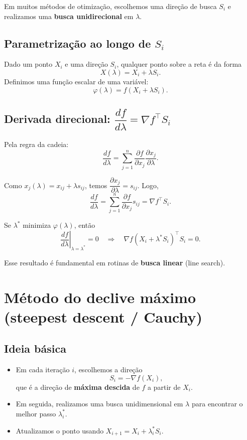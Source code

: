 \documentclass[9pt,a4paper]{extarticle}
\begin{document}
Em muitos métodos de otimização, escolhemos uma direção de busca $S_i$ e realizamos uma \textbf{busca unidirecional} em $\lambda$.

\subsection{Parametrização ao longo de $S_i$}

Dado um ponto $X_i$ e uma direção $S_i$, qualquer ponto sobre a reta é da forma
\[
  X(\lambda) = X_i + \lambda S_i.
\]
Definimos uma função escalar de uma variável:
\[
  \varphi(\lambda) = f(X_i + \lambda S_i).
\]

\subsection{Derivada direcional: $\dfrac{df}{d\lambda} = \nabla f^\top S_i$}

Pela regra da cadeia:
\[
  \frac{df}{d\lambda}
  = \sum_{j=1}^n \frac{\partial f}{\partial x_j} \frac{\partial x_j}{\partial \lambda}.
\]

Como $x_j(\lambda) = x_{ij} + \lambda s_{ij}$, temos $\dfrac{\partial x_j}{\partial \lambda} = s_{ij}$. Logo,
\[
  \frac{df}{d\lambda}
  = \sum_{j=1}^n \frac{\partial f}{\partial x_j} s_{ij}
  = \nabla f^\top S_i.
\]

\noindent Se $\lambda^\ast$ minimiza $\varphi(\lambda)$, então
\[
  \left.\frac{df}{d\lambda}\right|_{\lambda=\lambda^\ast} = 0
  \quad \Rightarrow \quad
  \nabla f(X_i + \lambda^\ast S_i)^\top S_i = 0.
\]

\noindent Esse resultado é fundamental em rotinas de \textbf{busca linear} (line search).

\section{Método do declive máximo (steepest descent / Cauchy)}

\subsection{Ideia básica}

\begin{itemize}
    \item Em cada iteração $i$, escolhemos a direção
    \[
      S_i = -\nabla f(X_i),
    \]
    que é a direção de \textbf{máxima descida} de $f$ a partir de $X_i$.
    \item Em seguida, realizamos uma busca unidimensional em $\lambda$ para encontrar o melhor passo $\lambda_i^\ast$.
    \item Atualizamos o ponto usando $X_{i+1} = X_i + \lambda_i^\ast S_i$.
\end{itemize}
\end{document}
